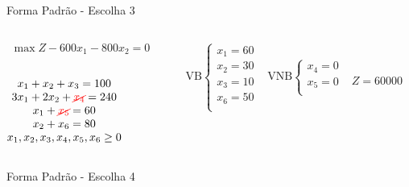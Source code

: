 \documentclass{beamer}
\begin{document}
\begin{frame}
{\begin{block}{Forma Padrão - {\color{cyan}Escolha 3}}
			\begin{columns}
				\begin{column}{0.35\textwidth}
					$
						\begin{matrix}
							\max Z - 600x_1 - 800x_2 = 0 \\
						\end{matrix}
					$ \\
					 \\
					$
						\begin{matrix}
							x_1  + x_2  + x_3                   = 100 \\
							3x_1 + 2x_2       + {\color{red}\cancel{x_4}}             = 240 \\
							x_1                     + {\color{red}\cancel{x_5}}       = 60 \\
							x_2                           + x_6 = 80 \\
							x_1,x_2, x_3, x_4, x_5, x_6 \ge 0 \\
						\end{matrix}
					$
				\end{column}
				\vline
				\hspace{0.1cm}
				\begin{column}{0.45\textwidth}
						$
							\begin{matrix}
								\text{VB} \left\{  \begin{matrix}
																 x_1 = 60 \\
																 x_2 = 30 \\
																 x_3 = 10 \\
																 x_6 = 50 \\
												   \end{matrix} 
										   \right.
								&
								\text{VNB} \left\{  \begin{matrix}
																 x_4 = 0 \\
																 x_5 = 0 \\
												   \end{matrix} 
										   \right. 
								\\
							 & \\
							\end{matrix}
						$
						{\color{red}$ Z = 60000 $}
				\end{column}
			\end{columns}
		\end{block}
	}
	{
		\begin{block}{Forma Padrão - {\color{cyan}Escolha 4}}

\end{block}}
\end{frame}
\end{document}
